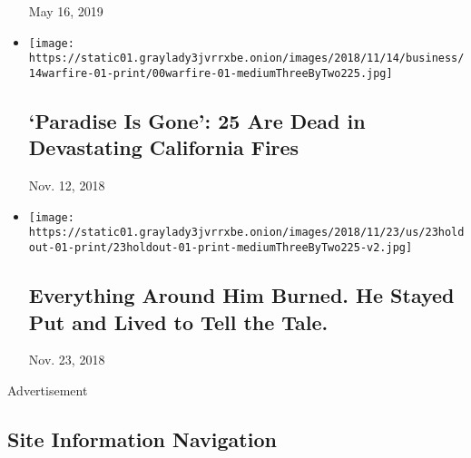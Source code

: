 \begin{itemize}
  May 16, 2019
\item
  \href{https://www.nytimes3xbfgragh.onion/2018/11/10/us/california-wildfires-paradise-malibu.html}{}

  \texttt{[image: https://static01.graylady3jvrrxbe.onion/images/2018/11/14/business/14warfire-01-print/00warfire-01-mediumThreeByTwo225.jpg]}

  \hypertarget{paradise-is-gone-25-are-dead-in-devastating-california-fires}{%
  \subsection{`Paradise Is Gone': 25 Are Dead in Devastating California
  Fires}\label{paradise-is-gone-25-are-dead-in-devastating-california-fires}}

  Nov. 12, 2018
\item
  \href{https://www.nytimes3xbfgragh.onion/2018/11/22/us/survivors-california-wildfires.html}{}

  \texttt{[image: https://static01.graylady3jvrrxbe.onion/images/2018/11/23/us/23holdout-01-print/23holdout-01-print-mediumThreeByTwo225-v2.jpg]}

  \hypertarget{everything-around-him-burned-he-stayed-put-and-lived-to-tell-the-tale}{%
  \subsection{Everything Around Him Burned. He Stayed Put and Lived to
  Tell the
  Tale.}\label{everything-around-him-burned-he-stayed-put-and-lived-to-tell-the-tale}}

  Nov. 23, 2018
\end{itemize}

Advertisement

\hypertarget{site-information-navigation}{%
\subsection{Site Information
Navigation}\label{site-information-navigation}}

